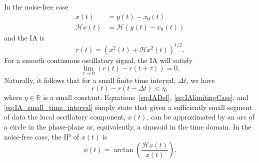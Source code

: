 \documentclass[a4paper]{IEEEtran}
\begin{document}
In the noise-free case 
\begin{align}
	x\left( t \right) &= y\left( t \right) - x_0\left( t \right) \\
	\mathcal{H}x\left( t \right) &= \mathcal{H}\left(y\left( t \right) - x_0\left( t \right)\right)
\end{align}
and the IA is
\begin{equation}\label{eq:IADef}
    r\left( t \right) = \left( x^2(t) + \mathcal{H}x^2(t)\right)^{1/2}.
\end{equation}
For a smooth continuous oscillatory signal, the IA will satisfy
\begin{equation}\label{eq:IAlimitingCase}
\mathop {\lim }\limits_{\tau  \to 0} \left( r\left( t \right) - r\left( t + \tau \right) \right) = 0.
\end{equation}
Naturally, it follows that for a small finite time interval, $\Delta t$, we have
\begin{equation}\label{eq:IA_small_time_interval}
    r(t)-r(t-\Delta t) < \eta,
\end{equation}
where $\eta \in \mathbb{R}$ is a small constant. Equations~\ref{eq:IADef}, \ref{eq:IAlimitingCase}, and \ref{eq:IA_small_time_interval} simply state that given a sufficiently small segment of data the local oscillatory component, $x(t)$, can be approximated by an arc of a circle in the phase-plane or, equivalently, a sinusoid in the time domain. In the noise-free case, the IP of $x(t)$ is
\begin{equation}\label{IPdef}
    \phi \left( t \right) = \arctan \left( \frac{\mathcal{H}x\left( t \right)}
    {x\left( t \right)} \right).
\end{equation}
\end{document}
